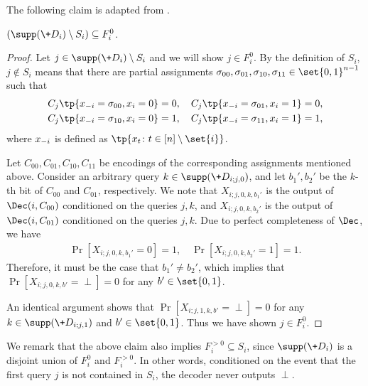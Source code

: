The following claim is adapted from .
\begin{claim} \label{clm:adaptive-bot-fix}
	$(\supp(\+D_i) \setminus S_i) \subseteq F_i^{0}$. 
\end{claim}
\begin{proof}
	Let $j \in \supp(\+D_i) \setminus S_i$ and we will show $j \in F_i^{0}$. By the definition of $S_i$, $j \notin S_i$ means that there are partial assignments $\sigma_{00}, \sigma_{01}, \sigma_{10}, \sigma_{11} \in \set{0,1}^{n-1}$ such that 
	\begin{align*}
	C_j\tp{\*x_{-i} = \sigma_{00}, x_i = 0} = 0, \quad C_j\tp{\*x_{-i} = \sigma_{01}, x_i = 1} = 0, \\
	C_j\tp{\*x_{-i} = \sigma_{10}, x_i = 0} = 1, \quad C_j\tp{\*x_{-i} = \sigma_{11}, x_i = 1} = 1,
	\end{align*}
	where $\*x_{-i}$ is defined as $\tp{x_t \colon t \in [n]\setminus\set{i}}$.
	
	Let $C_{00}, C_{01}, C_{10}, C_{11}$ be encodings of the corresponding assignments mentioned above. Consider an arbitrary query $k \in \supp(\+D_{i;j,0})$, and let $b_1', b_2'$ be the $k$-th bit of $C_{00}$ and $C_{01}$, respectively. We note that $X_{i;j,0,k,b_1'}$ is the output of $\Dec(i,C_{00})$ conditioned on the queries $j, k$, and $X_{i;j,0,k,b_2'}$ is the output of $\Dec(i,C_{01})$ conditioned on the queries $j, k$. Due to perfect completeness of $\Dec$, we have
	\begin{align*}
	\Pr[X_{i;j,0,k,b_1'}=0] = 1, \quad \Pr[X_{i;j,0,k,b_2'}=1]=1.
	\end{align*}
	Therefore, it must be the case that $b_1' \neq b_2'$, which implies that $\Pr[X_{i;j,0,k,b'}=\perp]=0$ for any $b' \in \set{0,1}$.
	
	An identical argument shows that $\Pr[X_{i;j,1,k,b'}=\perp]=0$ for any $k \in \supp(\+D_{i;j,1})$ and $b' \in \set{0,1}$. Thus we have shown $j \in F_i^{0}$.
\end{proof}

We remark that the above claim also implies $F_i^{>0} \subseteq S_i$, since $\supp(\+D_i)$ is a disjoint union of $F_i^{0}$ and $F_i^{>0}$. In other words, conditioned on the event that the first query $j$ is not contained in $S_i$, the decoder never outputs $\perp$.

